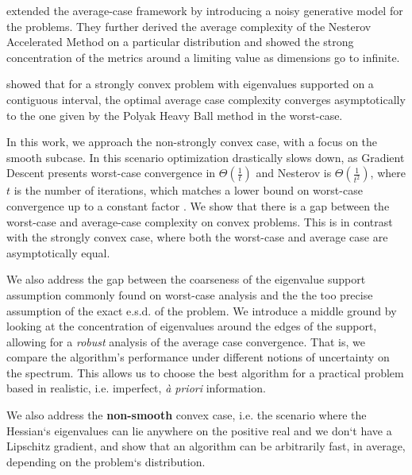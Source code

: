 \documentclass{article}
\begin{document}
\cite{paquette2020halting}  extended the average-case framework by introducing a noisy generative model for the problems. They further derived the average complexity of the Nesterov Accelerated Method \cite{nesterov2003introductory} on a particular distribution and showed the strong concentration of the metrics around a limiting value as dimensions go to infinite. 


\cite{scieur2020universal} showed that for a strongly convex problem with eigenvalues supported on a contiguous interval, the optimal average case complexity converges asymptotically to the one given by the Polyak Heavy Ball method in the worst-case.  

In this work, we approach the non-strongly convex case, with a focus on the smooth subcase. In this scenario optimization drastically slows down, as Gradient Descent presents worst-case convergence in $\Theta(\frac{1}{t})$ and Nesterov is $\Theta(\frac{1}{t^2})$, where $t$ is the number of iterations, which matches a lower bound on worst-case convergence up to a constant factor \citep{nesterov2003introductory}. We show that there is a gap between the worst-case and average-case complexity on convex problems. This is in contrast with the strongly convex case, where both the worst-case and average case are asymptotically equal.




We also address the gap between the coarseness of the eigenvalue support assumption commonly found on worst-case analysis and the the too precise assumption of the exact e.s.d. of the problem. We introduce a middle ground by looking at the concentration of eigenvalues around the edges of the support, allowing for a \emph{robust} analysis of the average case convergence. That is, we compare the algorithm's performance under different notions of uncertainty on the spectrum. This allows us  to choose the best algorithm for a practical problem based in realistic, i.e. imperfect, \textit{à priori} information. 

We also address the \textbf{non-smooth} convex case, i.e. the scenario where the Hessian`s eigenvalues can lie anywhere on the positive real and we don`t have a Lipschitz gradient, and show that an algorithm can be arbitrarily fast, in average,  depending on the problem`s distribution.

\end{document}
